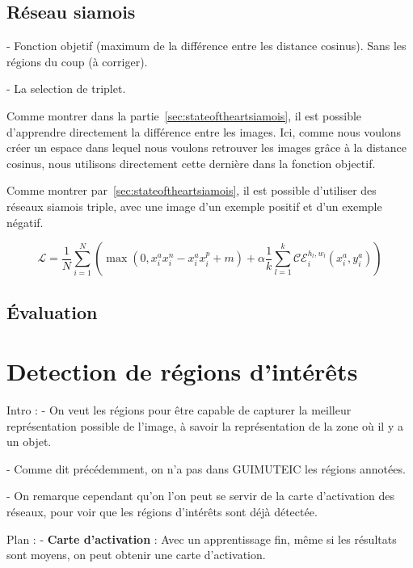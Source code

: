 \subsection{Réseau siamois}

 - Fonction objetif (maximum de la différence entre les distance cosinus). Sans les régions du coup (à corriger).
 
 - La selection de triplet.

Comme montrer dans la partie~\ref{sec:stateoftheartsiamois}, il est possible d'apprendre directement la différence entre les images. 
Ici, comme nous voulons créer un espace dans lequel nous voulons retrouver les images grâce à la distance cosinus, nous utilisons directement cette dernière dans la fonction objectif.

Comme montrer par~\ref{sec:stateoftheartsiamois}, il est possible d'utiliser des réseaux siamois triple, avec une image d'un exemple positif et d'un exemple négatif. 


\begin{equation}\label{eq:proposedloss}
\mathcal{L} =  \frac{1}{N} \sum_{i=1}^N \left( \max(0, x^a_i x^n_i - x^a_i x^p_i + m) +
\alpha \frac{1}{k} \sum_{l=1}^k \mathcal{CE}_i^{h_l,w_l}(x^a_i, y^a_i) \right)
\end{equation}


\subsection{Évaluation}



\section{Detection de régions d'intérêts }
\label{sec:regions}

Intro : 
 - On veut les régions pour être capable de capturer la meilleur représentation possible de l'image, à savoir la représentation de la zone où il y a un objet.
 
 - Comme dit précédemment, on n'a pas dans GUIMUTEIC les régions annotées.
 
 - On remarque cependant qu'on l'on peut se servir de la carte d'activation des réseaux, pour voir que les régions d'intérêts sont déjà détectée.
 
Plan :
 - \textbf{Carte d'activation} : Avec un apprentissage fin, même si les résultats sont moyens, on peut obtenir une carte d'activation.
 

